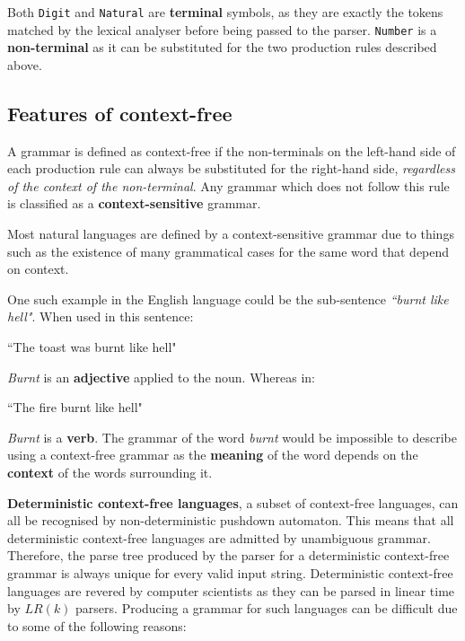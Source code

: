 \pagebreak

Both \verb|Digit| and \verb|Natural| are \textbf{terminal} symbols, as they are exactly the tokens matched by the lexical analyser before being passed to the parser. \verb|Number| is a \textbf{non-terminal} as it can be substituted for the two production rules described above.

\subsection{Features of context-free}
\label{sec:features-context-free}

A grammar is defined as context-free if the non-terminals on the left-hand side of each production rule can always be substituted for the right-hand side, \textit{regardless of the context of the non-terminal}. Any grammar which does not follow this rule is classified as a \textbf{context-sensitive} grammar.

Most natural languages are defined by a context-sensitive grammar due to things such as the existence of many grammatical cases for the same word that depend on context.

One such example in the English language could be the sub-sentence \textit{``burnt like hell"}. When used in this sentence:

\begin{center}
    ``The toast was burnt like hell"
\end{center}

\textit{Burnt} is an \textbf{adjective} applied to the noun. Whereas in:

\begin{center}
    ``The fire burnt like hell"
\end{center}

\textit{Burnt} is a \textbf{verb}. The grammar of the word \textit{burnt} would be impossible to describe using a context-free grammar as the \textbf{meaning} of the word depends on the \textbf{context} of the words surrounding it.\textsuperscript{\cite{longley_2016}}

\textbf{Deterministic context-free languages}, a subset of context-free languages, can all be recognised by non-deterministic pushdown automaton. This means that all deterministic context-free languages are admitted by unambiguous grammar\textsuperscript{\cite{rosenkrantz_stearns_1970}}. Therefore, the parse tree produced by the parser for a deterministic context-free grammar is always unique for every valid input string. Deterministic context-free languages are revered by computer scientists as they can be parsed in linear time by $LR(k)$ parsers. Producing a grammar for such languages can be difficult due to some of the following reasons:


